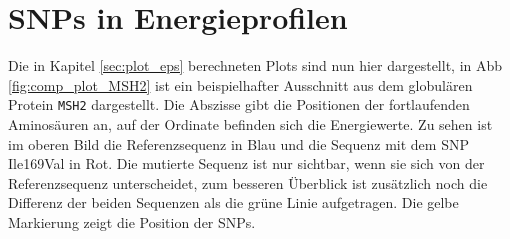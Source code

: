 \section{SNPs in Energieprofilen}

Die in Kapitel \ref{sec:plot_eps} berechneten Plots sind nun hier dargestellt, in \ac{Abb} \ref{fig:comp_plot_MSH2} ist ein beispielhafter Ausschnitt aus dem globulären Protein \texttt{MSH2} dargestellt. Die Abszisse gibt die Positionen der fortlaufenden Aminosäuren an, auf der Ordinate befinden sich die Energiewerte. Zu sehen ist im oberen Bild die Referenzsequenz in Blau und die Sequenz mit dem \ac{SNP} Ile169Val in Rot. Die mutierte Sequenz ist nur sichtbar, wenn sie sich von der Referenzsequenz unterscheidet, zum besseren Überblick ist zusätzlich noch die Differenz der beiden Sequenzen als die grüne Linie aufgetragen. Die gelbe Markierung zeigt die Position der \ac{SNP}s. 

